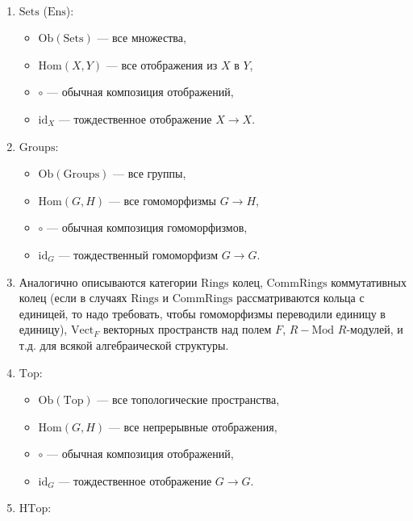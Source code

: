 \documentclass[12pt,a4paper]{article}
\newcommand{\Hom}{\mathrm{Hom}}
\newcommand{\Ob}{\mathrm{Ob}}
\newcommand{\id}{\mathrm{id}}
\newcommand{\Sets}{\mathrm{Sets}}
\newcommand{\Ens}{\mathrm{Ens}}
\newcommand{\Groups}{\mathrm{Groups}}
\newcommand{\Rings}{\mathrm{Rings}}
\newcommand{\CommRings}{\mathrm{CommRings}}
\newcommand{\Vect}{\mathrm{Vect}}
\newcommand{\Mod}{\mathrm{Mod}}
\newcommand{\Top}{\mathrm{Top}}
\newcommand{\HTop}{\mathrm{HTop}}
\begin{document}
    \begin{example}\ 
        \begin{enumerate}
            \item $\Sets$ ($\Ens$):
                \begin{itemize}
                    \item $\Ob(\Sets)$ --- все множества,
                    \item $\Hom(X, Y)$ --- все отображения из $X$ в $Y$,
                    \item $\circ$ --- обычная композиция отображений,
                    \item $\id_X$ --- тождественное отображение $X \to X$.
                \end{itemize}
            \item $\Groups$:
                \begin{itemize}
                    \item $\Ob(\Groups)$ --- все группы,
                    \item $\Hom(G, H)$ --- все гомоморфизмы $G \to H$,
                    \item $\circ$ --- обычная композиция гомоморфизмов,
                    \item $\id_G$ --- тождественный гомоморфизм $G \to G$.
                \end{itemize}
            \item Аналогично описываются категории $\Rings$ колец, $\CommRings$ коммутативных колец (если в случаях $\Rings$ и $\CommRings$ рассматриваются кольца с единицей, то надо требовать, чтобы гомоморфизмы переводили единицу в единицу), $\Vect_F$ векторных пространств над полем $F$, $R-\Mod$ $R$-модулей, и т.д. для всякой алгебраической структуры.
            \item $\Top$:
                \begin{itemize}
                    \item $\Ob(\Top)$ --- все топологические пространства,
                    \item $\Hom(G, H)$ --- все непрерывные отображения,
                    \item $\circ$ --- обычная композиция отображений,
                    \item $\id_G$ --- тождественное отображение $G \to G$.
                \end{itemize}
            \item $\HTop$:
                \begin{itemize}

\end{itemize}
\end{enumerate}
\end{example}
\end{document}
